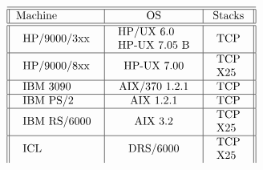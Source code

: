 \[
\begin{tabular}[h]{||l|c|c||}
\hline
\hline
Machine & OS & Stacks \\
\hline
\hline
\begin{tabular}{l} HP/9000/3xx \end{tabular} & \begin{tabular}{l}  HP/UX 6.0\\HP-UX 7.05 B \end{tabular} & \begin{tabular}{l} TCP \end{tabular} \\
\hline
\begin{tabular}{l} HP/9000/8xx \end{tabular} & \begin{tabular}{l}  HP-UX 7.00 \end{tabular} & \begin{tabular}{l} TCP\\X25 \end{tabular} \\
\hline
\begin{tabular}{l} IBM 3090 \end{tabular} & \begin{tabular}{l} 	AIX/370 1.2.1 \end{tabular} & \begin{tabular}{l} TCP \end{tabular} \\
\hline
\begin{tabular}{l} IBM PS/2 \end{tabular} & \begin{tabular}{l} 	AIX 1.2.1 \end{tabular} & \begin{tabular}{l} TCP \end{tabular} \\
\hline
\begin{tabular}{l} IBM RS/6000 \end{tabular} & \begin{tabular}{l} 	AIX 3.2 \end{tabular} & \begin{tabular}{l} TCP\\X25 \end{tabular} \\
\hline
\begin{tabular}{l} ICL \end{tabular} & \begin{tabular}{l}  DRS/6000 \end{tabular} & \begin{tabular}{l} TCP\\X25 \end{tabular} \\

\end{tabular}\]
